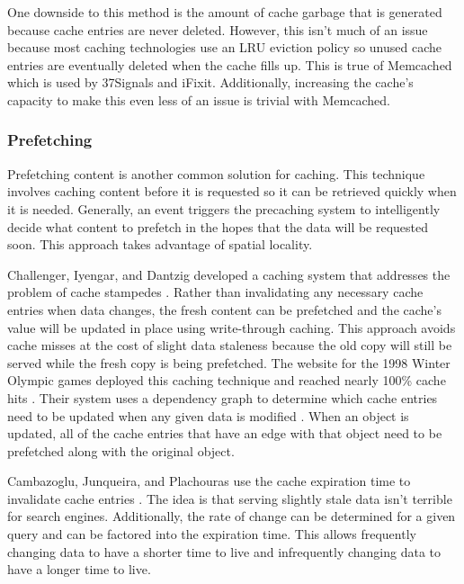 \documentclass[12pt]{ucthesis}
\begin{document}
One downside to this method is the amount of cache garbage that is generated because cache entries are never deleted.
However, this isn't much of an issue because most caching technologies use an LRU eviction policy so unused cache entries are eventually deleted when the cache fills up.
This is true of \textsf{Memcached} which is used by \textsf{37Signals} and \textsf{iFixit}.
Additionally, increasing the cache's capacity to make this even less of an issue is trivial with \textsf{Memcached}.

\subsubsection{Prefetching}
Prefetching content is another common solution for caching.
This technique involves caching content before it is requested so it can be retrieved quickly when it is needed.
Generally, an event triggers the precaching system to intelligently decide what content to prefetch in the hopes that the data will be requested soon.
This approach takes advantage of spatial locality.

Challenger, Iyengar, and Dantzig developed a caching system that addresses the problem of cache stampedes \cite{scalableConsistentCaching}.
Rather than invalidating any necessary cache entries when data changes, the fresh content can be prefetched and the cache's value will be updated in place using write-through caching.
This approach avoids cache misses at the cost of slight data staleness because the old copy will still be served while the fresh copy is being prefetched.
The website for the 1998 Winter Olympic games deployed this caching technique and reached nearly 100\% cache hits \cite{scalableConsistentCaching}.
Their system uses a dependency graph to determine which cache entries need to be updated when any given data is modified \cite{scalableConsistentCaching}.
When an object is updated, all of the cache entries that have an edge with that object need to be prefetched along with the original object.

Cambazoglu, Junqueira, and Plachouras use the cache expiration time to invalidate cache entries \cite{refreshingPerspectiveSearch}.
The idea is that serving slightly stale data isn't terrible for search engines.
Additionally, the rate of change can be determined for a given query and can be factored into the expiration time.
This allows frequently changing data to have a shorter time to live and infrequently changing data to have a longer time to live.
\end{document}
